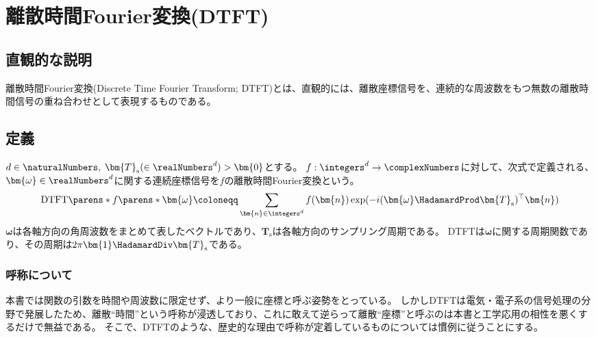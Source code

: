 \chapter{離散時間Fourier変換(DTFT)}
    \newcommand{\Ts}{T_\text{s}}
    \newcommand{\DTFT}[1]{\mathrm{DTFT}\parens*{#1}}
    \newcommand{\DTFTwithArg}[2]{\DTFT{#1}\parens*{#2}}
    \newcommand{\IDTFT}[1]{\mathrm{IDTFT}\parens*{#1}}
    \newcommand{\IDTFTwithArg}[2]{\IDTFT{#1}\parens*{#2}}
    \section{直観的な説明}
        離散時間Fourier変換(Discrete Time Fourier Transform; DTFT)とは、直観的には、離散座標信号を、連続的な周波数をもつ無数の離散時間信号の重ね合わせとして表現するものである。
    \section{定義}
        $d\in\naturalNumbers,\;\bm{T}_\text{s}(\in\realNumbers^d)>\bm{0}$とする。
        $f:\integers^d\to\complexNumbers$に対して、次式で定義される、$\bm{\omega}\in\realNumbers^d$に関する連続座標信号を$f$の離散時間Fourier変換という。
        \[ \DTFTwithArg{f}{\bm{\omega}} \coloneqq \sum_{\bm{n}\in\integers^d} f(\bm{n})\exp(-i(\bm{\omega}\HadamardProd\bm{T}_\text{s})^\top\bm{n}) \]
        $\bm{\omega}$は各軸方向の角周波数をまとめて表したベクトルであり、$\bm{T}_\text{s}$は各軸方向のサンプリング周期である。
        DTFTは$\bm{\omega}$に関する周期関数であり、その周期は$2\pi\bm{1}\HadamardDiv\bm{T}_\text{s}$である。
        \subsection{呼称について}
            本書では関数の引数を時間や周波数に限定せず、より一般に座標と呼ぶ姿勢をとっている。
            しかしDTFTは電気・電子系の信号処理の分野で発展したため、離散``時間''という呼称が浸透しており、これに敢えて逆らって離散``座標''と呼ぶのは本書と工学応用の相性を悪くするだけで無益である。
            そこで、DTFTのような、歴史的な理由で呼称が定着しているものについては慣例に従うことにする。
